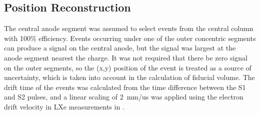 \subsection{Position Reconstruction}
The central anode segment was assumed to select events from the central column with 100\% efficiency. Events occurring under one of the outer concentric segments can produce a signal on the central anode, but the signal was largest at the anode segment nearest the charge. It was not required that there be zero signal on the outer segments, so the (x,y) position of the event is treated as a source of uncertainty, which is taken into account in the calculation of fiducial volume. The drift time of the events was calculated from the time difference between the S1 and S2 pulses, and a linear scaling of 2~mm/us was applied using the electron drift velocity in \ac{LXe} measurements in \cite{Aprile2010}. 

